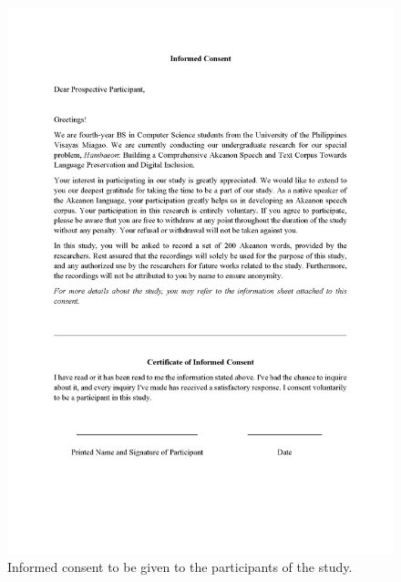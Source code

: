 \begin{figure}[h!]
    \centering
    \includegraphics[width=\textwidth]{./appendix/informed-consent-1.png}
    \caption{Informed consent to be given to the participants of the study.}
    \label{fig:informedConsent}
\end{figure}

